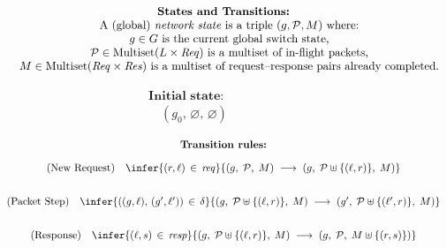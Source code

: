 \begin{figure}[t]
    \centering
    \renewcommand{\arraystretch}{1.6}
    \[
    \begin{array}{c}
    \textbf{States and Transitions:}
    \\
    \quad
    \text{A (global) \emph{network state} is a triple }(g,\mathcal{P},M)\text{ where:}
    \\
    \quad
    g \in G \text{ is the current global switch state,}
    \\
    \quad
    \mathcal{P} \in \text{Multiset}(L \times \mathit{Req}) \text{ is a multiset of in-flight packets,}
    \\
    \quad
    M \in \text{Multiset}(\mathit{Req} \times \mathit{Res}) \text{ is a multiset of request--response pairs already completed.}
    \end{array}
    \]

    \[
    \begin{array}{c}
    \textbf{Initial state:}
    \\
    \quad (g_0,\,\varnothing,\,\varnothing)
    \end{array}
    \]

    \[
    \begin{array}{c}
    \textbf{Transition rules:}
    \\[1em]
    \text{(New Request)}\quad\infer{
    (r,\ell)\,\in\,\mathit{req}
    }
    {(g,\;\mathcal{P},\;M) \;\longrightarrow\; (g,\;\mathcal{P} \uplus \{(\ell,r)\},\;M)}
    \\[2em]
    \text{(Packet Step)}\quad\infer{
    ((g,\ell),\,(g',\ell')) \,\in\, \delta
    }
    {(g,\;\mathcal{P} \uplus \{(\ell,r)\},\;M) \;\longrightarrow\; (g',\;\mathcal{P} \uplus \{(\ell',r)\},\;M)}
    \\[2em]
    \text{(Response)}\quad\infer{
    (\ell,s)\,\in\,\mathit{resp}
    }
    {(g,\;\mathcal{P} \uplus \{(\ell,r)\},\;M) \;\longrightarrow\; (g,\;\mathcal{P},\;M \uplus \{(r,s)\})}
    \end{array}
    \]


\end{figure}
